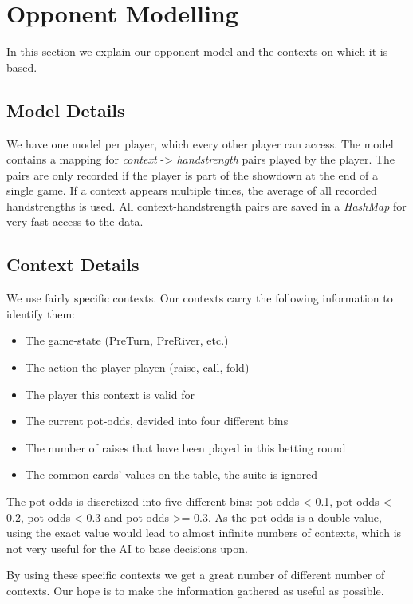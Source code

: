 \section{Opponent Modelling}
In this section we explain our opponent model and the contexts on which it is based.

\subsection{Model Details}
We have one model per player, which every other player can access. The model contains a mapping for \textit{context} ->
\textit{handstrength} pairs played by the player. The pairs are only recorded if the player is part of the showdown at
the end of a single game. If a context appears multiple times, the average of all recorded handstrengths is used. All
context-handstrength pairs are saved in a \textit{HashMap} for very fast access to the data.

\subsection{Context Details}
We use fairly specific contexts. Our contexts carry the following information to identify them:
\begin{itemize}
    \item The game-state (PreTurn, PreRiver, etc.)
    \item The action the player playen (raise, call, fold)
    \item The player this context is valid for
    \item The current pot-odds, devided into four different bins
    \item The number of raises that have been played in this betting round
    \item The common cards' values on the table, the suite is ignored
\end{itemize}

The pot-odds is discretized into five different bins: pot-odds < 0.1, pot-odds < 0.2, pot-odds < 0.3 and pot-odds >=
0.3. As the pot-odds is a double value, using the exact value would lead to almost infinite numbers of contexts, which
is not very useful for the AI to base decisions upon.

By using these specific contexts we get a great number of different number of contexts. Our hope is to make the
information gathered as useful as possible. 
